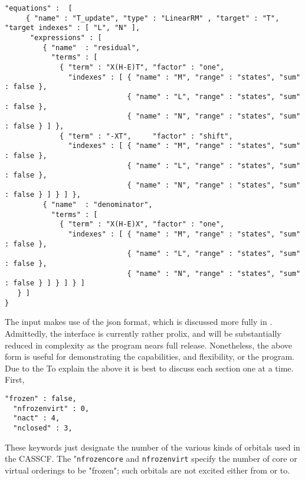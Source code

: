 \begin{lstlisting}[label={lst:input}]
  "equations" :  [
     { "name" : "T_update", "type" : "LinearRM" , "target" : "T", "target indexes" : [ "L", "N" ],
      "expressions" : [
         { "name"  : "residual",
           "terms" : [
             { "term" : "X(H-E)T", "factor" : "one",
               "indexes" : [ { "name" : "M", "range" : "states", "sum" : false },
                             { "name" : "L", "range" : "states", "sum" : false },
                             { "name" : "N", "range" : "states", "sum" : false } ] },
             { "term" : "-XT",     "factor" : "shift",
               "indexes" : [ { "name" : "M", "range" : "states", "sum" : false },
                             { "name" : "L", "range" : "states", "sum" : false },
                             { "name" : "N", "range" : "states", "sum" : false } ] } ] },
         { "name"  : "denominator",
           "terms" : [
             { "term" : "X(H-E)X", "factor" : "one",                                                 
               "indexes" : [ { "name" : "M", "range" : "states", "sum" : false },
                             { "name" : "L", "range" : "states", "sum" : false },
                             { "name" : "N", "range" : "states", "sum" : false } ] } ] } ]
   } ]
}                                                 
\end{lstlisting}         

\noindent The input makes use of the json format, which is discussed more fully in  \cite{JSON}.
Admittedly, the interface is currently rather prolix, and will be substantially reduced in complexity
as the program nears full release. Nonetheless, the above form is useful for demonstrating the capabilities,
and flexibility, or the program. \\

\noindent Due to the  To explain the above it is best to discuss each section one at a time. First,
\begin{lstlisting}[label={lst:casscf}]
  "frozen" : false,
  "nfrozenvirt" : 0,
  "nact" : 4,
  "nclosed" : 3,
\end{lstlisting}         
\noindent These keywords just designate the number of the various kinds of orbitals used in the CASSCF.
The "\texttt{nfrozencore} and \texttt{nfrozenvirt} specify the number of core or virtual orderings to be "frozen";
such orbitals are not excited either from or to.\\

